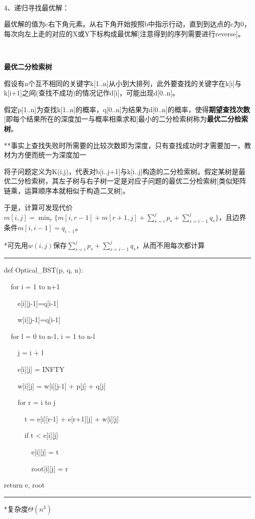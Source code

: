\documentclass[a4paper,UTF8,fontset=windows]{ctexart}
\newenvironment{code}{\rule{36em}{0.1em}\setlength{\parindent}{1em}

}{

\setlength{\parindent}{0em}\rule{36em}{0.1em}}
\begin{document}
\

4、递归寻找最优解：

最优解的值为c右下角元素。从右下角开始按照b中指示行动，直到到达点的c为0，每次向左上走的对应的X或Y下标构成最优解[注意得到的序列需要进行reverse]。

\

\textbf{最优二分检索树}

假设有n个互不相同的关键字k[1..n]从小到大排列，此外要查找的关键字在k[i]与k[i+1]之间(查找不成功)的情况记作d[i]，可能出现d[0..n]。

假定p[1..n]为查找k[1..n]的概率，q[0..n]为结果为d[0..n]的概率，使得\textbf{期望查找次数}[即每个结果所在的深度加一与概率相乘求和]最小的二分检索树称为\textbf{最优二分检索树}。

**\hspace{0em}事实上查找失败时所需要的比较次数即为深度，只有查找成功时才需要加一，教材为方便而统一为深度加一

将子问题定义为K(i,j)，代表对b[i..j+1]与k[i..j]构造的二分检索树。假定某树是最优二分检索树，其左子树与右子树一定是对应子问题的最优二分检索树[类似矩阵链乘，运算顺序本就相似于构造二叉树]。

于是，计算可发现代价$m[i,j]=\min_r\{m[i,r-1]+m[r+1,j]+\sum_{s=i}^jp_s+\sum_{s=i-1}^jq_s\}$，且边界条件$m[i,i-1]=q_{i-1}$。

*\hspace{0em}可先用$w(i,j)$保存$\sum_{s=i}^jp_s+\sum_{s=i-1}^jq_s$，从而不用每次都计算

\begin{code}
def Optical\_BST(p, q, n):

\ \ for i = 1 to n+1

\ \ \ \ e[i][j-1]=q[i-1]

\ \ \ \ w[i][j-1]=q[i-1]

\ \ for l = 0 to n-1, i = 1 to n-l

\ \ \ \ j = i + l

\ \ \ \ e[i][j] = INFTY

\ \ \ \ w[i][j] = w[i][j-1] + p[j] + q[j]

\ \ \ \ for r = i to j

\ \ \ \ \ \ t = e[i][r-1] + e[r+1][j] + w[i][j]

\ \ \ \ \ \ if t < e[i][j]

\ \ \ \ \ \ \ \ e[i][j] = t

\ \ \ \ \ \ \ \ root[i][j] = r

return e, root
\end{code}

*\hspace{0em}复杂度$\Theta(n^3)$
\end{document}
